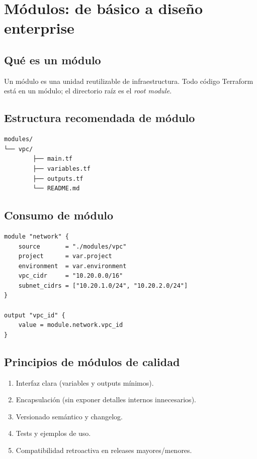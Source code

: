 \documentclass[12pt,a4paper]{article}
\begin{document}
\section{Módulos: de básico a diseño enterprise}

\subsection{Qué es un módulo}
Un módulo es una unidad reutilizable de infraestructura. Todo código Terraform está en un módulo; el directorio raíz es el \textit{root module}.

\subsection{Estructura recomendada de módulo}
\begin{lstlisting}[caption=Estructura de módulo reutilizable]
modules/
└── vpc/
		├── main.tf
		├── variables.tf
		├── outputs.tf
		└── README.md
\end{lstlisting}

\subsection{Consumo de módulo}
\begin{lstlisting}[caption=Uso de módulo local]
module "network" {
	source       = "./modules/vpc"
	project      = var.project
	environment  = var.environment
	vpc_cidr     = "10.20.0.0/16"
	subnet_cidrs = ["10.20.1.0/24", "10.20.2.0/24"]
}

output "vpc_id" {
	value = module.network.vpc_id
}
\end{lstlisting}

\subsection{Principios de módulos de calidad}
\begin{enumerate}[label=\arabic*.]
		\item Interfaz clara (variables y outputs mínimos).
		\item Encapsulación (sin exponer detalles internos innecesarios).
		\item Versionado semántico y changelog.
		\item Tests y ejemplos de uso.
		\item Compatibilidad retroactiva en releases mayores/menores.
\end{enumerate}
\end{document}
